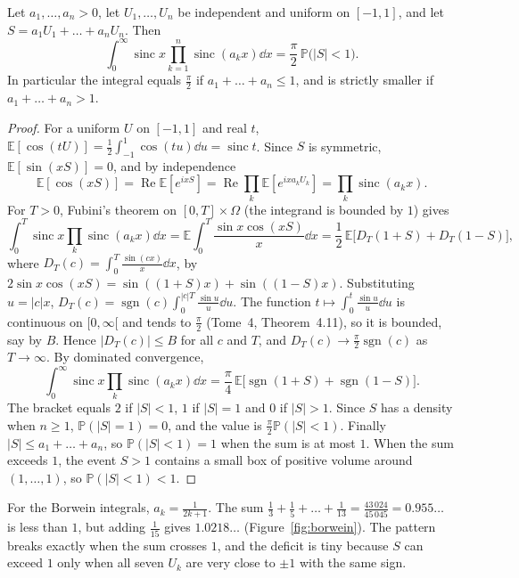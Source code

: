 \begin{theorem}\label{thm:borwein}
Let $a_1,\dots,a_n>0$, let $U_1,\dots,U_n$ be independent and uniform on $[-1,1]$, and let $S=a_1U_1+\dots+a_nU_n$. Then
\[
\int_0^\infty\operatorname{sinc}x\prod_{k=1}^n\operatorname{sinc}(a_kx)\dd x=\frac\pi2\,\mathbb P\bigl(|S|<1\bigr).
\]
In particular the integral equals $\frac\pi2$ if $a_1+\dots+a_n\le1$, and is strictly smaller if $a_1+\dots+a_n>1$.
\end{theorem}
\begin{proof}
For a uniform $U$ on $[-1,1]$ and real $t$, $\mathbb E[\cos(tU)]=\frac12\int_{-1}^1\cos(tu)\dd u=\operatorname{sinc}t$. Since $S$ is symmetric,
$\mathbb E[\sin(xS)]=0$, and by independence
\[
\mathbb E[\cos(xS)]=\operatorname{Re}\mathbb E[e^{ixS}]=\operatorname{Re}\prod_k\mathbb E[e^{ixa_kU_k}]=\prod_k\operatorname{sinc}(a_kx).
\]
For $T>0$, Fubini's theorem on $[0,T]\times\Omega$ (the integrand is bounded by $1$) gives
\[
\int_0^T\operatorname{sinc}x\prod_k\operatorname{sinc}(a_kx)\dd x=\mathbb E\int_0^T\frac{\sin x\cos(xS)}x\dd x=\frac12\,\mathbb E\bigl[D_T(1+S)+D_T(1-S)\bigr],
\]
where $D_T(c)=\int_0^T\frac{\sin(cx)}x\dd x$, by $2\sin x\cos(xS)=\sin((1+S)x)+\sin((1-S)x)$. Substituting $u=|c|x$, $D_T(c)=\operatorname{sgn}(c)\int_0^{|c|T}\frac{\sin u}u\dd u$.
The function $t\mapsto\int_0^t\frac{\sin u}u\dd u$ is continuous on $[0,\infty[$ and tends to $\frac\pi2$ (Tome~4, Theorem~4.11), so it is bounded, say by $B$.
Hence $|D_T(c)|\le B$ for all $c$ and $T$, and $D_T(c)\to\frac\pi2\operatorname{sgn}(c)$ as $T\to\infty$. By dominated convergence,
\[
\int_0^\infty\operatorname{sinc}x\prod_k\operatorname{sinc}(a_kx)\dd x=\frac\pi4\,\mathbb E\bigl[\operatorname{sgn}(1+S)+\operatorname{sgn}(1-S)\bigr].
\]
The bracket equals $2$ if $|S|<1$, $1$ if $|S|=1$ and $0$ if $|S|>1$. Since $S$ has a density when $n\ge1$, $\mathbb P(|S|=1)=0$, and the value is
$\frac\pi2\mathbb P(|S|<1)$. Finally $|S|\le a_1+\dots+a_n$, so $\mathbb P(|S|<1)=1$ when the sum is at most $1$. When the sum exceeds $1$, the event
$S>1$ contains a small box of positive volume around $(1,\dots,1)$, so $\mathbb P(|S|<1)<1$.
\end{proof}

For the Borwein integrals, $a_k=\frac1{2k+1}$. The sum $\frac13+\frac15+\dots+\frac1{13}=\frac{43\,024}{45\,045}=0.955\ldots$ is less than $1$, but adding $\frac1{15}$
gives $1.0218\ldots$ (Figure~\ref{fig:borwein}). The pattern breaks exactly when the sum crosses $1$, and the deficit is tiny because $S$ can exceed $1$ only
when all seven $U_k$ are very close to $\pm1$ with the same sign.

